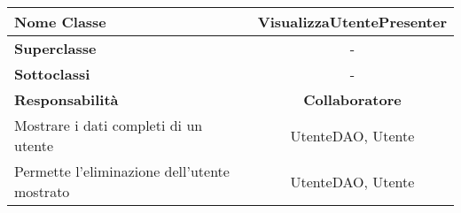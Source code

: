 
\setcounter{table}{0}
\begin{table}[H]
    \centering
    \begin{tabularx}{\textwidth}{||   X  ||  c   ||}
        \hline
        \rowcolor{Gray}
        \textbf{Nome Classe} & VisualizzaUtentePresenter\\
        \hline
        \textbf{Superclasse}  &  - \\
        \hline
        \textbf{Sottoclassi} & - \\
        \hline
        \hline
         \textbf{Responsabilità} & \textbf{Collaboratore} \\
         \hline
          Mostrare i dati completi di un utente & UtenteDAO, Utente \\
         \hline
          Permette l'eliminazione dell'utente mostrato& UtenteDAO, Utente \\
         \hline
    \end{tabularx}
\end{table}

    
       
